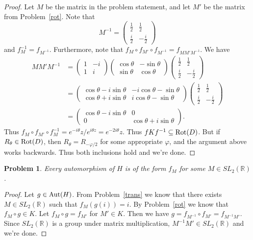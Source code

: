 \documentclass{article}
\newtheorem{problem}{Problem}
\begin{document}
\begin{proof}
Let $M$ be the matrix in the problem statement, and let $M'$ be the matrix from Problem~\ref{rot}. Note that
\[
M^{-1} =
\left (
\begin{array}{cc}
\frac{1}{2} & \frac{1}{2}\\
\frac{i}{2} & -\frac{i}{2}
\end{array}
\right )
\]
and $f_{M}^{-1} = f_{M^{-1}}$. Furthermore, note that $f_M \circ f_{M'} \circ f_{M^{-1}} = f_{MM'M^{-1}}$. We have
\begin{align*}
MM'M^{-1}
&=
\left (
\begin{array}{cc}
1 & -i\\
1 & i
\end{array}
\right )
\left (
\begin{array}{cc}
\cos \theta & -\sin \theta\\
\sin \theta & \cos \theta
\end{array}
\right )
\left (
\begin{array}{cc}
\frac{1}{2} & \frac{1}{2}\\
\frac{i}{2} & -\frac{i}{2}
\end{array}
\right )\\
&=
\left (
\begin{array}{cc}
\cos \theta - i \sin \theta & -i \cos \theta - \sin \theta\\
\cos \theta + i \sin \theta & i \cos \theta - \sin \theta
\end{array}
\right )
\left (
\begin{array}{cc}
\frac{1}{2} & \frac{1}{2}\\
\frac{i}{2} & -\frac{i}{2}
\end{array}
\right )\\
&=
\left (
\begin{array}{cc}
\cos \theta - i \sin \theta & 0\\
0 & \cos \theta + i\sin \theta
\end{array}
\right ).
\end{align*}
Thus $f_M \circ f_{M'} \circ f_{M}^{-1} = e^{-i \theta}z/e^{i \theta z} = e^{-2i\theta}z$. Thus $fKf^{-1} \subseteq \textup{Rot}(D)$. But if $R_{\theta} \in \textup{Rot}(D)$, then $R_{\theta} = R_{-\varphi/2}$ for some appropriate $\varphi$, and the argument above works backwards. Thus both inclusions hold and we're done.
\end{proof}

\begin{problem}
Every automorphism of $H$ is of the form $f_M$ for some $M \in SL_2(\mathbb{R})$.
\end{problem}
\begin{proof}
Let $g \in \textup{Aut}(H)$. From Problem~\ref{trans} we know that there exists $M \in SL_2(\mathbb{R})$ such that $f_M(g(i)) = i$. By Problem~\ref{rot} we know that $f_M \circ g \in K$. Let $f_M \circ g = f_{M'}$ for $M' \in K$. Then we have $g = f_{M^{-1}} \circ f_{M'} = f_{M^{-1}M'}$. Since $SL_2(\mathbb{R})$ is a group under matrix multiplication, $M^{-1}M' \in SL_2(\mathbb{R})$ and we're done.
\end{proof}
\end{document}
